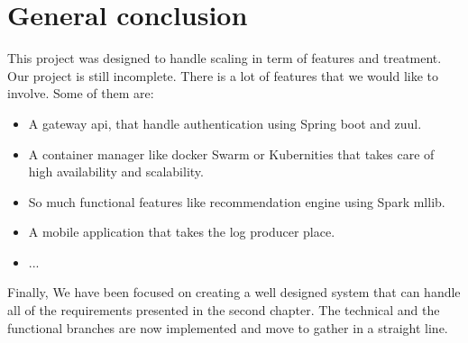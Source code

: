 \section{General conclusion}
\label{sec:sec01}
This project was designed to handle scaling in term of features and treatment. Our project is still incomplete.
There is a lot of features that we would like to involve. Some of them are:
 \begin{itemize}
	\item A gateway api, that handle authentication using Spring boot and zuul.
	\item A container manager like docker Swarm or Kubernities that takes care of high availability and scalability.
	\item So much functional features like recommendation engine using Spark mllib.
	\item A mobile application that takes the log producer place.
  \item ...
\end{itemize}
Finally, We have been focused on creating a well designed system that can handle all of the requirements
 presented in the second chapter. The technical and the functional branches are now implemented and move
  to gather in a straight line. 


